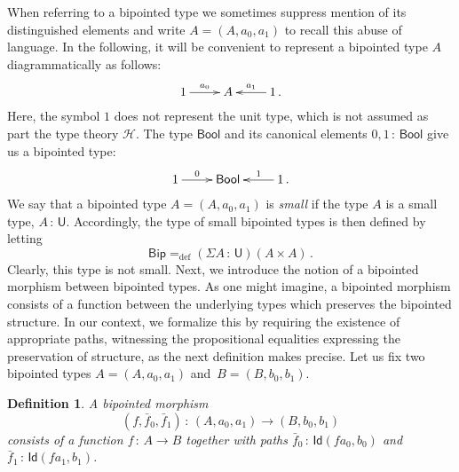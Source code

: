 \documentclass[10pt,a4paper,oneside,reqno]{amsart}
\numberwithin{equation}{section}
\theoremstyle{mythm}
\theoremstyle{mydef}
\newtheorem{definition}[theorem]{Definition}
\theoremstyle{myrmk}
\newcommand{\ie}{\text{i.e.\ }}
\newcommand{\defeq}{=_{\mathrm{def}}}
\newcommand{\co}{\,{:}\,}
\newcommand{\Hint}{\mathcal{H}}
\newcommand{\Bool}{\mathsf{Bool}}
\newcommand{\Id}{\mathsf{Id}}
\newcommand{\U}{\mathsf{U}}
\newcommand{\Bip}{\mathsf{Bip}}
\begin{document}
When referring to a bipointed type we sometimes suppress mention of its distinguished elements and write $A = (A, a_0, a_1)$ to recall this abuse of language.  In the following, it will be convenient to represent a bipointed type $A$  
diagrammatically as follows:
\[
\xymatrix{
1 \ar[r]^-{a_0}&  A & 1 \ar[l]_-{a_1} \, .}
 \]
Here, the symbol $1$ does not represent the unit type, which is not assumed as part the type theory $\Hint$.
The type $\Bool$ and its canonical elements $0, 1 \co \Bool$ give us a bipointed type:
\[
\xymatrix{
 1 \ar[r]^-{0}&  \Bool  & 1 \ar[l]_-{1} \, . }
 \]
We say that a bipointed type $A = (A, a_0, a_1)$ is \emph{small} if the type $A$ is a small type, \ie $A \co \U$. 
Accordingly, the type of small bipointed types is then defined by letting 
\[
\Bip \defeq (\Sigma A \co \U)( A \times A ) \, .
\]
Clearly,  this type is not small.  Next, we introduce the notion of a bipointed morphism between bipointed types. 
As one might imagine, a bipointed morphism consists of a function between the underlying types which preserves
the bipointed structure. In our context, we formalize this by requiring the existence of appropriate paths, witnessing the propositional equalities expressing the preservation of structure, as the next definition makes precise. Let us fix two bipointed types $A = (A, a_0, a_1)$ and~$B = (B, b_0, b_1)$. 


\begin{definition} A \emph{bipointed morphism} 
\[
(f, \bar{f}_0, \bar{f}_1)  \co (A, a_0, a_1)  \to (B, b_0, b_1)
\] 
consists of a function $f \co A \to B$ together with paths $\bar{f}_0 \co  \Id(f a_0, b_0)$ 
and~$\bar{f}_1 \co \Id(f a_1, b_1)$.  
\end{definition}
\end{document}
